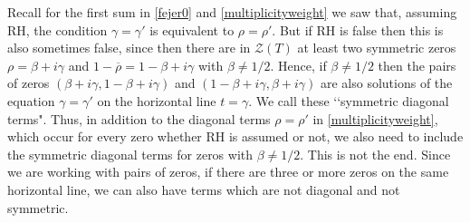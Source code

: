 \documentclass[11pt]{amsart}
\theoremstyle{remark}
\theoremstyle{plain}
\numberwithin{equation}{section}
\begin{document}



Recall for the first sum in \eqref{fejer0} and \eqref{multiplicityweight} we saw that, assuming RH, the condition $\gamma = \gamma'$ is equivalent to $\rho =\rho'$. But if RH is false then this is also sometimes false, since then there are in $\mathcal{Z}(T)$ at least two symmetric zeros $\rho = \beta +i\gamma$ and $1-\overline{\rho} = 1-\beta+i\gamma$ with $\beta \neq 1/2$.
Hence, if $\beta \neq 1/2$ then the pairs of zeros $(\beta+i\gamma, 1-\beta+i\gamma)$ and $(1-\beta+i\gamma, \beta+i\gamma)$ are also solutions of the equation $\gamma=\gamma'$ on the horizontal line $t=\gamma$. We call these \lq\lq symmetric diagonal terms". Thus, in addition to the diagonal terms $\rho=\rho'$ in \eqref{multiplicityweight}, which occur for every zero whether RH is assumed or not, we also need to include the symmetric diagonal terms for zeros with $\beta\neq 1/2$.
This is not the end. Since we are working with pairs of zeros, if there are three or more zeros on the same horizontal line, we can also have terms which are not diagonal and not symmetric.
\end{document}
